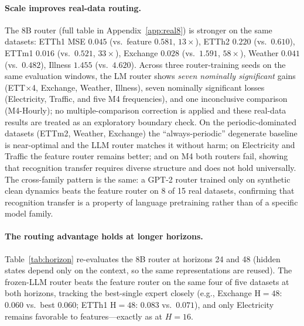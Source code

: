 \documentclass{article}
\begin{document}
\paragraph{Scale improves real-data routing.}
The $8$B router (full table in Appendix~\ref{app:real8}) is stronger on the
same datasets: ETTh1 MSE $0.045$ (vs.\ feature $0.581$, $13\times$), ETTh2
$0.220$ (vs.\ $0.610$), ETTm1 $0.016$ (vs.\ $0.521$, $33\times$), Exchange
$0.028$ (vs.\ $1.591$, $58\times$), Weather $0.041$ (vs.\ $0.482$), Illness
$1.455$ (vs.\ $4.620$).  Across three router-training seeds on the same
evaluation windows, the LM router shows \emph{seven nominally significant}
gains (ETT$\times$4, Exchange, Weather, Illness), seven nominally significant
losses (Electricity, Traffic, and five M4 frequencies), and one inconclusive
comparison (M4-Hourly); no multiple-comparison correction is applied and these
real-data results are treated as an exploratory boundary check.  On the
periodic-dominated datasets (ETTm2, Weather, Exchange) the ``always-periodic''
degenerate baseline is near-optimal and the LLM router matches it without
harm; on Electricity and Traffic the feature router remains better; and on M4
both routers fail, showing that recognition transfer requires diverse
structure and does not hold universally.  The cross-family pattern is the
same: a GPT-2 router trained only on synthetic clean dynamics beats the
feature router on 8 of 15 real datasets, confirming that recognition transfer
is a property of language pretraining rather than of a specific model family.

\paragraph{The routing advantage holds at longer horizons.}
Table~\ref{tab:horizon} re-evaluates the $8$B router at horizons 24 and 48
(hidden states depend only on the context, so the same representations are
reused).  The frozen-LLM router beats the feature router on the same four of
five datasets at both horizons, tracking the best-single expert closely (e.g.,
Exchange H$=48$: $0.060$ vs.\ best $0.060$; ETTh1 H$=48$: $0.083$ vs.\ $0.071$),
and only Electricity remains favorable to features---exactly as at $H{=}16$.
\end{document}

